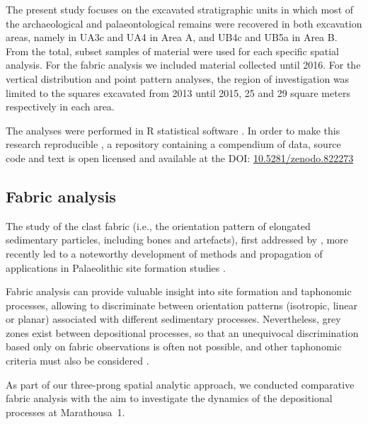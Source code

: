 \documentclass[preprint,authoryear,times]{elsarticle} %
\begin{document}
The present study focuses on the excavated stratigraphic units in which most of the archaeological and palaeontological remains were recovered in both excavation areas, namely in UA3c and UA4 in Area A, and UB4c and UB5a in Area B. From the total, subset samples of material were used for each specific spatial analysis. For the fabric analysis we included material collected until 2016. For the vertical distribution and point pattern analyses, the region of investigation was limited to the squares excavated from 2013 until 2015, 25 and 29 square meters respectively in each area.

The analyses were performed in \textsf{R} statistical software \citep{RCoreTeam2016}. In order to make this research reproducible \citep{Marwick2017,Marwick2017a}, a repository containing a compendium of data, source code and text is open licensed and available at the DOI: \href{https://doi.org/10.5281/zenodo.822273}{10.5281/zenodo.822273}

\subsection{Fabric analysis}

The study of the clast fabric (i.e., the orientation pattern of elongated sedimentary particles, including bones and artefacts), first addressed by \cite{Voorhies1966,Isaac1967,Bar-Yosef1972,Schick1986}, more recently led to a noteworthy development of methods and propagation of applications in Palaeolithic site formation studies \citep[][among others]{Bertran1995,Bertran1997,Lenoble2004,Lenoble2008,McPherron2005,Benito-Calvo2009,Benito-Calvo2011a,Benito-Calvo2011,Bernatchez2010,Boschian2010,Dominguez-Rodrigo2012,Dominguez-Rodrigo2013,Dominguez-Rodrigo2014,Torre2013a,Walter2013,Garcia-Moreno2016,Sanchez-Romero2016}.

Fabric analysis can provide valuable insight into site formation and taphonomic processes, allowing to discriminate between orientation patterns (isotropic, linear or planar) associated with different sedimentary processes. Nevertheless, grey zones exist between depositional processes, so that an unequivocal discrimination based only on fabric observations is often not possible, and other taphonomic criteria must also be considered \citep{Lenoble2004}.

As part of our three-prong spatial analytic approach, we conducted comparative fabric analysis with the aim to investigate the dynamics of the depositional processes at Marathousa~1.
\end{document}

